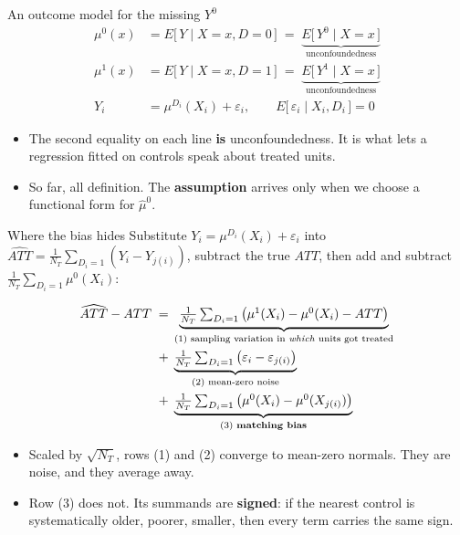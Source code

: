 \documentclass[
  11pt,
  ignorenonframetext,
  aspectratio=169,
]{beamer}
\providecommand{\tightlist}{%
  \setlength{\itemsep}{0pt}\setlength{\parskip}{0pt}}
\begin{document}
\begin{frame}{An outcome model for the missing \(Y^0\)}
\protect{}\label{an-outcome-model-for-the-missing-y0}
\[
\begin{aligned}
\mu^0(x) &= E\big[\,Y \mid X{=}x, D{=}0\,\big] \;=\; \underbrace{E\big[\,Y^0 \mid X{=}x\,\big]}_{\text{unconfoundedness}} \\
\mu^1(x) &= E\big[\,Y \mid X{=}x, D{=}1\,\big] \;=\; \underbrace{E\big[\,Y^1 \mid X{=}x\,\big]}_{\text{unconfoundedness}} \\[0.3em]
Y_i &= \mu^{D_i}(X_i) + \varepsilon_i, \qquad E\big[\,\varepsilon_i \mid X_i, D_i\,\big] = 0
\end{aligned}
\]

\begin{itemize}
\tightlist
\item
  The second equality on each line \textbf{is} unconfoundedness. It is
  what lets a regression fitted on controls speak about treated units.
\item
  So far, all definition. The \textbf{assumption} arrives only when we
  choose a functional form for \(\hat\mu^0\).
\end{itemize}
\end{frame}

\begin{frame}{Where the bias hides}
\protect{}\label{where-the-bias-hides}
Substitute \(Y_i = \mu^{D_i}(X_i)+\varepsilon_i\) into
\(\widehat{ATT}=\frac{1}{N_T}\sum_{D_i=1}(Y_i - Y_{j(i)})\), subtract
the true \(ATT\), then add and subtract
\(\frac{1}{N_T}\sum_{D_i=1}\mu^0(X_i)\):

\[
\begin{aligned}
\widehat{ATT} - ATT \;=\;& \underbrace{\tfrac{1}{N_T}\textstyle\sum_{D_i=1}\big(\mu^1(X_i) - \mu^0(X_i) - ATT\big)}_{\text{(1) sampling variation in \emph{which} units got treated}} \\
+\;& \underbrace{\tfrac{1}{N_T}\textstyle\sum_{D_i=1}\big(\varepsilon_i - \varepsilon_{j(i)}\big)}_{\text{(2) mean-zero noise}} \\
+\;& \underbrace{\tfrac{1}{N_T}\textstyle\sum_{D_i=1}\big(\mu^0(X_i) - \mu^0(X_{j(i)})\big)}_{\text{(3) \textbf{matching bias}}}
\end{aligned}
\]

\begin{itemize}
\tightlist
\item
  Scaled by \(\sqrt{N_T}\), rows (1) and (2) converge to mean-zero
  normals. They are noise, and they average away.
\item
  Row (3) does not. Its summands are \textbf{signed}: if the nearest
  control is systematically older, poorer, smaller, then every term
  carries the same sign.
\end{itemize}
\end{frame}
\end{document}
